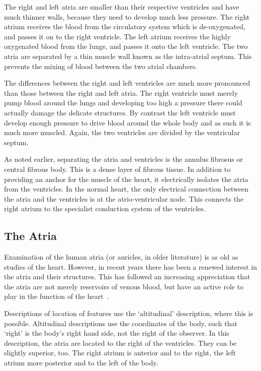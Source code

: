 The right and left atria are smaller than their respective ventricles and have
much thinner walls, because they need to develop much less pressure.  The right
atrium receives the blood from the circulatory system which is de-oxygenated,
and passes it on to the right ventricle.  The left atrium receives the highly
oxygenated blood from the lungs, and passes it onto the left ventricle.  The two
atria are separated by a thin muscle wall known as the intra-atrial septum.
This prevents the mixing of blood between the two atrial chambers.

The differences between the right and left ventricles are much more pronounced
than those between the right and left atria.  The right ventricle must merely
pump blood around the lungs and developing too high a pressure there could
actually damage the delicate structures.  By contrast the left ventricle must
develop enough pressure to drive blood around the whole body and as such it is
much more muscled.  Again, the two ventricles are divided by the ventricular
septum.

As noted earlier, separating the atria and ventricles is the annulus fibrosus
or central fibrous body.
This is a dense layer of fibrous tissue.
In addition to providing an anchor for the muscle of the heart, it electrically
isolates the atria from the ventricles.
In the normal heart, the only electrical connection between the atria and the
ventricles is at the atrio-ventricular node.
This connects the right atrium to the specialist conduction system of the
ventricles.

\subsection{The Atria}

Examination of the human atria (or auricles, in older literature) is as old as studies
of the heart.
However, in recent years there has been a renewed interest in the
atria and their structures.
This has followed an increasing appreciation that the atria are not merely
reservoirs of venous blood, but have an active role to play in the function of
the heart~\cite{Ho2002a,Ho2002b,Ho2009,Platonov2007,Platonov2008a}.

Descriptions of location of features use the `altitudinal' description, where
this is possible.
Altitudinal descriptions use the coordinates of the body, such that `right' is
the body's right hand side, not the right of the observer.
In this description, the atria are located to the right of the ventricles.
They can be slightly superior, too.
The right atrium is anterior and to the right, the left atrium more posterior and to
the left of the body.

